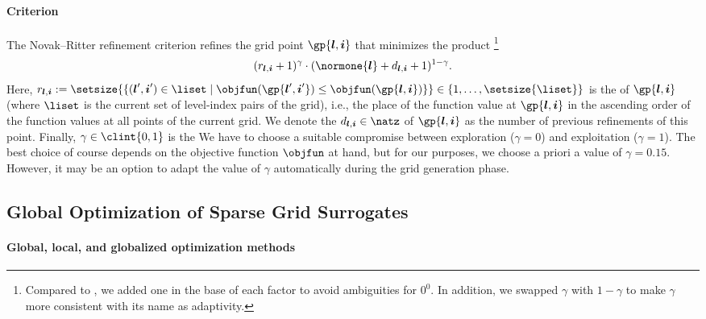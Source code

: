 
\paragraph{Criterion}

The Novak--Ritter refinement criterion \cite{Novak96Global}
refines the grid point $\gp{\*l,\*i}$ that minimizes the product%
\footnote{%
  Compared to \cite{Novak96Global},
  we added one in the base of each factor to avoid ambiguities
  for $0^0$.
  In addition, we swapped $\gamma$ with $1-\gamma$
  to make $\gamma$ more consistent with its name as adaptivity.%
}
\begin{equation}
  (r_{\*l,\*i} + 1)^\gamma \cdot
  (\normone{\*l} + d_{\*l,\*i} + 1)^{1 - \gamma}.
\end{equation}
Here, $r_{\*l,\*i} := \setsize{
  \{(\*l',\*i') \in \liset \mid
  \objfun(\gp{\*l',\*i'}) \le \objfun(\gp{\*l,\*i})\}
} \in \{1, \dotsc, \setsize{\liset}\}$ is the  of $\gp{\*l,\*i}$
(where $\liset$ is the current set of level-index pairs of the grid), i.e.,
the place of the function value at $\gp{\*l,\*i}$
in the ascending order of the function values at all points
of the current grid.
We denote the  $d_{\*l,\*i} \in \natz$ of $\gp{\*l,\*i}$
as the number of previous refinements of this point.
Finally, $\gamma \in \clint{0, 1}$ is the 
We have to choose a suitable compromise between exploration ($\gamma = 0$)
and exploitation ($\gamma = 1$).
The best choice of course depends on the objective function $\objfun$ at hand,
but for our purposes, we choose a priori a value of $\gamma = 0.15$.
However, it may be an option to adapt the value of $\gamma$ automatically
during the grid generation phase.



\subsection{Global Optimization of Sparse Grid Surrogates}
\label{sec:522method}

\paragraph{Global, local, and globalized optimization methods}

